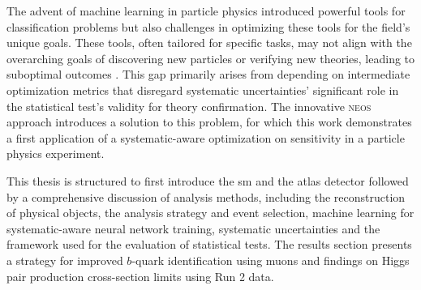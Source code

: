 The advent of machine learning in particle physics introduced powerful tools for classification problems but also challenges in optimizing these tools for the field's unique goals. These tools, often tailored for specific tasks, may not align with the overarching goals of discovering new particles or verifying new theories, leading to suboptimal outcomes \citep{guest2018deep}.
This gap primarily arises from depending on intermediate optimization metrics that disregard systematic uncertainties' significant role in the statistical test's validity for theory confirmation. The innovative \textsc{neos} approach \citep{Simpson_2023} introduces a solution to this problem, for which this work demonstrates a first application of a systematic-aware optimization on sensitivity in a particle physics experiment.

This thesis is structured to first introduce the \ac{sm} and the \ac{atlas} detector followed by a comprehensive discussion of analysis methods, including the reconstruction of physical objects, the analysis strategy and event selection, machine learning for systematic-aware neural network training, systematic uncertainties and the framework used for the evaluation of statistical tests. The results section presents a strategy for improved $b$-quark identification using muons and findings on Higgs pair production cross-section limits using Run 2 data.













